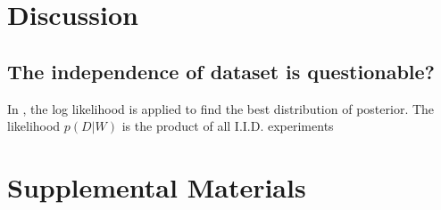 \documentclass{article}
\begin{document}
\section{Discussion}

\subsection{The independence of dataset is questionable?}

In \cite{chandra2021bayesian}, the log likelihood is applied to find the best distribution of posterior. The likelihood $p(D|W)$ is the product of all I.I.D. experiments





\section{Supplemental Materials}
\end{document}
